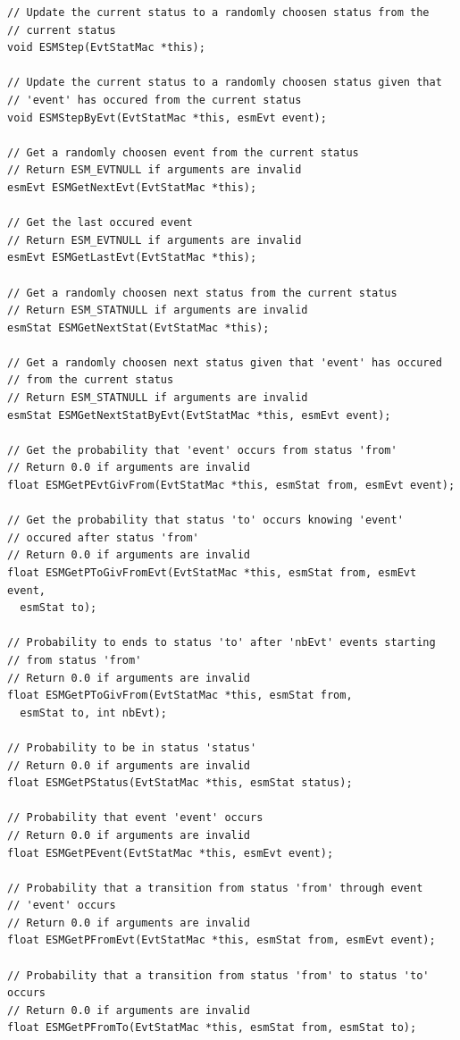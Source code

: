 \documentclass[12pt, a4paper]{article}
\begin{document}
\begin{scriptsize}
\begin{ttfamily}
\begin{lstlisting}
// Update the current status to a randomly choosen status from the
// current status
void ESMStep(EvtStatMac *this);

// Update the current status to a randomly choosen status given that 
// 'event' has occured from the current status
void ESMStepByEvt(EvtStatMac *this, esmEvt event);

// Get a randomly choosen event from the current status 
// Return ESM_EVTNULL if arguments are invalid
esmEvt ESMGetNextEvt(EvtStatMac *this);

// Get the last occured event 
// Return ESM_EVTNULL if arguments are invalid
esmEvt ESMGetLastEvt(EvtStatMac *this);

// Get a randomly choosen next status from the current status
// Return ESM_STATNULL if arguments are invalid
esmStat ESMGetNextStat(EvtStatMac *this);

// Get a randomly choosen next status given that 'event' has occured 
// from the current status
// Return ESM_STATNULL if arguments are invalid
esmStat ESMGetNextStatByEvt(EvtStatMac *this, esmEvt event);

// Get the probability that 'event' occurs from status 'from'
// Return 0.0 if arguments are invalid
float ESMGetPEvtGivFrom(EvtStatMac *this, esmStat from, esmEvt event);

// Get the probability that status 'to' occurs knowing 'event'
// occured after status 'from'
// Return 0.0 if arguments are invalid
float ESMGetPToGivFromEvt(EvtStatMac *this, esmStat from, esmEvt event, 
  esmStat to);

// Probability to ends to status 'to' after 'nbEvt' events starting 
// from status 'from'
// Return 0.0 if arguments are invalid
float ESMGetPToGivFrom(EvtStatMac *this, esmStat from, 
  esmStat to, int nbEvt);

// Probability to be in status 'status'
// Return 0.0 if arguments are invalid
float ESMGetPStatus(EvtStatMac *this, esmStat status);

// Probability that event 'event' occurs
// Return 0.0 if arguments are invalid
float ESMGetPEvent(EvtStatMac *this, esmEvt event);

// Probability that a transition from status 'from' through event 
// 'event' occurs
// Return 0.0 if arguments are invalid
float ESMGetPFromEvt(EvtStatMac *this, esmStat from, esmEvt event);

// Probability that a transition from status 'from' to status 'to' occurs
// Return 0.0 if arguments are invalid
float ESMGetPFromTo(EvtStatMac *this, esmStat from, esmStat to);


\end{lstlisting}
\end{ttfamily}
\end{scriptsize}
\end{document}
